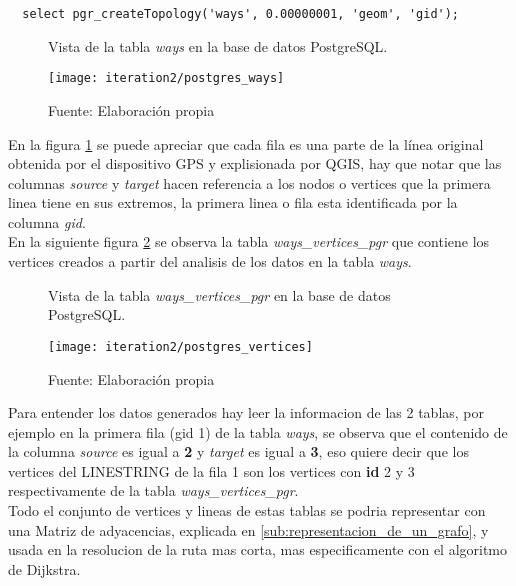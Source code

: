\begin{verbatim}
  select pgr_createTopology('ways', 0.00000001, 'geom', 'gid');
\end{verbatim}

\begin{figure}[H]
  \begin{center}
    \caption{Vista de la tabla \emph{ways} en la base de datos PostgreSQL.}
    \label{fig:postgres_ways}
    \texttt{[image: iteration2/postgres\_ways]}
    \caption*{Fuente: Elaboración propia}
  \end{center}
\end{figure}

En la figura \ref{fig:postgres_ways} se puede apreciar que cada fila es una parte de la línea original obtenida por el dispositivo GPS y explisionada por QGIS, hay que notar que las columnas \emph{source} y \emph{target} hacen referencia a los nodos o vertices que la primera linea tiene en sus extremos, la primera linea o fila esta identificada por la columna \emph{gid}.\\

En la siguiente figura \ref{fig:postgres_vertices} se observa la tabla \emph{ways\_vertices\_pgr} que contiene los vertices creados a partir del analisis de los datos en la tabla \emph{ways}.

\begin{figure}[H]
  \begin{center}
    \caption{Vista de la tabla \emph{ways\_vertices\_pgr} en la base de datos PostgreSQL.}
    \label{fig:postgres_vertices}
    \texttt{[image: iteration2/postgres\_vertices]}
    \caption*{Fuente: Elaboración propia}
  \end{center}
\end{figure}

Para entender los datos generados hay leer la informacion de las 2 tablas, por ejemplo en la primera  fila (gid 1) de la tabla \emph{ways}, se observa que el contenido de la columna \emph{source} es igual a \textbf{2} y \emph{target} es igual a \textbf{3}, eso quiere decir que los vertices del LINESTRING de la fila 1 son los vertices con \textbf{id} 2 y 3 respectivamente de la tabla \emph{ways\_vertices\_pgr}.\\


Todo el conjunto de vertices y lineas de estas tablas se podria representar con una Matriz de adyacencias, explicada en \ref{sub:representacion_de_un_grafo}, y usada en la resolucion de la ruta mas corta, mas especificamente con el algoritmo de Dijkstra.

